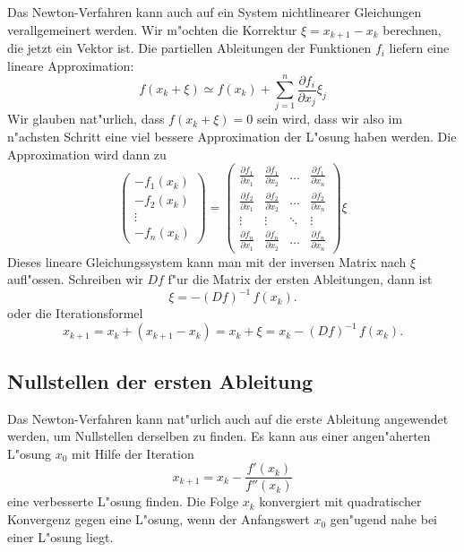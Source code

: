 Das Newton-Verfahren kann auch auf ein System nichtlinearer
Gleichungen verallgemeinert werden. Wir m"ochten die Korrektur
$\xi=x_{k+1}-x_k$ berechnen, die jetzt ein Vektor ist.
Die partiellen Ableitungen der Funktionen $f_i$ liefern eine
lineare Approximation:
\[
f(x_k+\xi)\simeq f(x_k) + \sum_{j=1}^n\frac{\partial f_i}{\partial x_j}\xi_j
\]
Wir glauben nat"urlich, dass $f(x_k+\xi)=0$ sein wird, dass wir also
im n"achsten Schritt eine viel bessere Approximation der L"osung haben werden.
Die Approximation wird dann zu
\[
\begin{pmatrix}
-f_1(x_k)\\
-f_2(x_k)\\
\vdots\\
-f_n(x_k)
\end{pmatrix}
=
\begin{pmatrix}
\frac{\partial f_1}{\partial x_1}
	&\frac{\partial f_1}{\partial x_2}
		&\dots
			&\frac{\partial f_1}{\partial x_n}\\
\frac{\partial f_2}{\partial x_1}
	&\frac{\partial f_2}{\partial x_2}
		&\dots
			&\frac{\partial f_2}{\partial x_n}\\
\vdots
	&\vdots
		&\ddots
			&\vdots\\
\frac{\partial f_n}{\partial x_1}
	&\frac{\partial f_n}{\partial x_2}
		&\dots
			&\frac{\partial f_n}{\partial x_n}
\end{pmatrix}\xi
\]
Dieses lineare Gleichungssystem kann man mit der inversen
Matrix nach $\xi$ aufl"ossen. Schreiben wir $Df$ f"ur die Matrix
der ersten Ableitungen, dann ist
\[
\xi = -(Df)^{-1}\, f(x_k).
\]
oder die Iterationsformel
\begin{equation}
x_{k+1} = x_k + (x_{k+1}-x_k)=x_k+\xi=x_k-(Df)^{-1}\,f(x_k).
\label{nlp:newton-iteration-ndim}
\end{equation}

\subsection{Nullstellen der ersten Ableitung}
Das Newton-Verfahren kann nat"urlich auch auf die erste Ableitung
angewendet werden, um Nullstellen derselben zu finden.
Es kann aus einer angen"aherten L"osung $x_0$
mit Hilfe der Iteration
\begin{equation}
x_{k+1}=x_k-\frac{f'(x_k)}{f''(x_k)}
\label{newton-1dim}
\end{equation}
eine verbesserte L"osung finden. Die Folge $x_k$ konvergiert mit
quadratischer Konvergenz gegen eine L"osung, wenn der Anfangswert
$x_0$ gen"ugend nahe bei einer L"osung liegt.

